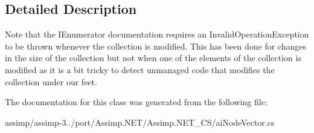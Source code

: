 \subsection{Detailed Description}
Note that the I\+Enumerator documentation requires an Invalid\+Operation\+Exception to be thrown whenever the collection is modified. This has been done for changes in the size of the collection but not when one of the elements of the collection is modified as it is a bit tricky to detect unmanaged code that modifies the collection under our feet. 

The documentation for this class was generated from the following file\+:\begin{DoxyCompactItemize}
\item 
assimp/assimp-\/3../port/\+Assimp.\+N\+E\+T/\+Assimp.\+N\+E\+T\+\_\+\+C\+S/ai\+Node\+Vector.\+cs\end{DoxyCompactItemize}
